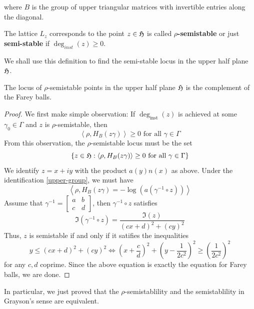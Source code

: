 where $B$ is the group of upper triangular matrices with invertible entries along the diagonal.
\begin{definition}
  The lattice $L_z$ corresponds to the point $z \in \operatorname{\mathfrak{H}}$ is called \textbf{$\rho$-semistable} or just \textbf{semi-stable}
  if $\deg_{inst}(z) \ge 0$.
\end{definition}
We shall use this definition to find the semi-stable locus in the upper half plane $\operatorname{\mathfrak{H}}$.
\begin{prop}
  The locus of $\rho$-semistable points in the upper half plane $\operatorname{\mathfrak{H}}$ is the
  complement of the Farey balls.
\end{prop}
\begin{proof}
  We first make simple observation: If $\deg_{\text{inst}}(z)$ is achieved at some
  $\gamma_0 \in \Gamma$ and $z$ is $\rho$-semistable, then
  \[\left\langle \rho, H_B(z\gamma)\right\rangle \ge 0 \mbox{ for all } \gamma \in \Gamma\]
  From this observation, the $\rho$-semistable locus must be the set
  \[ \left\lbrace z \in \operatorname{\mathfrak{H}}: \left\langle \rho, H_B(z\gamma)\right\rangle \ge 0 \mbox{ for all } \gamma \in \Gamma \right\rbrace\]
  We identify $z=x+iy$ with the product $a(y)n(x)$ as above. Under the identification \ref{upper-group}, we must have
  \[\left\langle \rho, H_B(z\gamma) = -\log(a(\gamma^{-1} \circ z)) \right\rangle\]
  Assume that $\gamma^{-1} =
    \begin{bmatrix}
      a & b \\
      c & d
    \end{bmatrix}$, then $\gamma^{-1} \circ z$ satisfies
  \[\Im(\gamma^{-1}\circ z) = \dfrac{\Im(z)}{(cx+d)^2+(cy)^2}\]
  Thus, $z$ is semistable if and only if it satifies the inequalities
  \[y \le(cx+d)^2+(cy)^2  \Leftrightarrow \left(x+\dfrac{c}{d}\right)^2+\left(y-\dfrac{1}{2c^2}\right)^2 \ge \left(\dfrac{1}{2c^2}\right)^2 \]
  for any $c,d$ coprime. Since the above equation is exactly the equation for Farey balls, we are done.
\end{proof}
In particular, we just proved that the $\rho$-semistablility and the semistablility in Grayson's sense
are equivalent.

